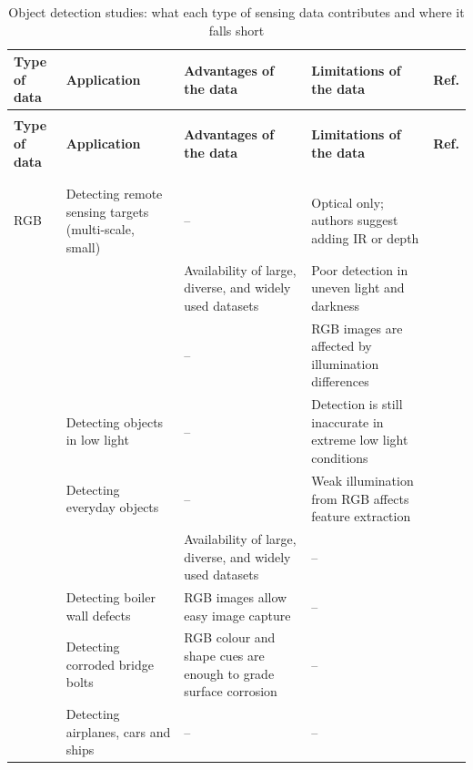 {\scriptsize
\renewcommand{\arraystretch}{1.15}
\setlength{\tabcolsep}{3pt}
\begin{xltabular}{\textwidth}{>{\RaggedRight\arraybackslash}p{2.1cm}>{\RaggedRight\arraybackslash}p{2.9cm}>{\RaggedRight\arraybackslash}X>{\RaggedRight\arraybackslash}Xp{0.95cm}}
\caption{Object detection studies: what each type of sensing data contributes and where it falls short}\label{tab:detection-data}\\
\toprule
\textbf{Type of data} & \textbf{Application} & \textbf{Advantages of the data} & \textbf{Limitations of the data} & \textbf{Ref.} \\
\midrule
\endfirsthead
{}\\
\toprule
\textbf{Type of data} & \textbf{Application} & \textbf{Advantages of the data} & \textbf{Limitations of the data} & \textbf{Ref.} \\
\midrule
\endhead
\midrule{}\\
\endfoot
\bottomrule
{}\\
\endlastfoot
RGB & Detecting remote sensing targets (multi-scale, small) & -- & Optical only; authors suggest adding IR or depth & \citep{Wang2026a} \\
 &  & Availability of large, diverse, and widely used datasets & Poor detection in uneven light and darkness & \citep{Zhang2024} \\
 &  & -- & RGB images are affected by illumination differences & \citep{Lalitha2022} \\
 & Detecting objects in low light & -- & Detection is still inaccurate in extreme low light conditions & \citep{Wu2023} \\
 & Detecting everyday objects & -- & Weak illumination from RGB affects feature extraction & \citep{Wu2026} \\
 &  & Availability of large, diverse, and widely used datasets & -- & \citep{Srivastava2021} \\
 & Detecting boiler wall defects & RGB images allow easy image capture & -- & \citep{Sun2022} \\
 & Detecting corroded bridge bolts & RGB colour and shape cues are enough to grade surface corrosion & -- & \citep{Li2024b} \\
 & Detecting airplanes, cars and ships & -- & -- & \citep{Han2022} \\

\end{xltabular}}
